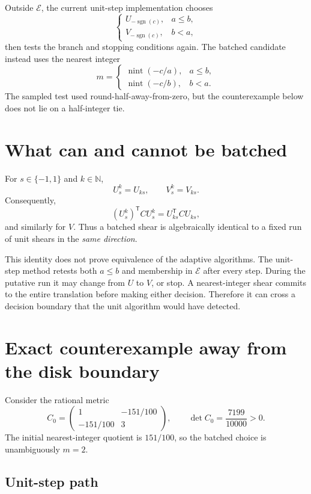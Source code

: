\documentclass[11pt]{article}
\newcommand{\Eset}{\mathcal{E}}
\newcommand{\trans}{\mathsf{T}}
\begin{document}
Outside $\Eset$, the current unit-step implementation chooses
\[
 \begin{cases}
 U_{-\operatorname{sgn}(c)},&a\leq b,\\
 V_{-\operatorname{sgn}(c)},&b<a,
 \end{cases}
\]
then tests the branch and stopping conditions again.  The batched candidate
instead uses the nearest integer
\[
 m=
 \begin{cases}
 \operatorname{nint}(-c/a),&a\leq b,\\
 \operatorname{nint}(-c/b),&b<a.
 \end{cases}
\]
The sampled test used round-half-away-from-zero, but the counterexample below
does not lie on a half-integer tie.

\section{What can and cannot be batched}

For $s\in\{-1,1\}$ and $k\in\mathbb{N}$,
\[
 U_s^k=U_{ks},\qquad V_s^k=V_{ks}.
\]
Consequently,
\[
 (U_s^k)^\trans C U_s^k=U_{ks}^\trans C U_{ks},
\]
and similarly for $V$.  Thus a batched shear is algebraically identical to a
fixed run of unit shears in the \emph{same direction}.

This identity does not prove equivalence of the adaptive algorithms.  The
unit-step method retests both $a\leq b$ and membership in $\Eset$ after every
step.  During the putative run it may change from $U$ to $V$, or stop.  A
nearest-integer shear commits to the entire translation before making either
decision.  Therefore it can cross a decision boundary that the unit algorithm
would have detected.

\section{Exact counterexample away from the disk boundary}

Consider the rational metric
\[
 C_0=
 \begin{pmatrix}
 1&-151/100\\
 -151/100&3
 \end{pmatrix},
 \qquad
 \det C_0=\frac{7199}{10000}>0.
\]
The initial nearest-integer quotient is $151/100$, so the batched choice is
unambiguously $m=2$.

\subsection*{Unit-step path}
\end{document}
